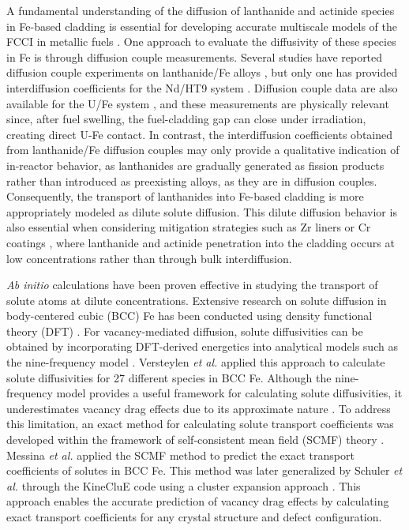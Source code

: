 \documentclass[preprint,12pt]{elsarticle}
\begin{document}
A fundamental understanding of the diffusion of lanthanide and actinide species in Fe-based cladding is essential for developing accurate multiscale models of the FCCI in metallic fuels \cite{aagesen_jr_physics-based_2022, aagesen_mechanistic_2023}. One approach to evaluate the diffusivity of these species in Fe is through diffusion couple measurements. Several studies have reported diffusion couple experiments on lanthanide/Fe alloys \cite{INAGAKI2013574, JERRED2020152387, helmreich_diffusion_2014}, but only one has provided interdiffusion coefficients for the Nd/HT9 system \cite{helmreich_diffusion_2014}. Diffusion couple data are also available for the U/Fe system \cite{huang2012interdiffusion, chen2015intermetallic}, and these measurements are physically relevant since, after fuel swelling, the fuel-cladding gap can close under irradiation, creating direct U-Fe contact. In contrast, the interdiffusion coefficients obtained from lanthanide/Fe diffusion couples may only provide a qualitative indication of in-reactor behavior, as lanthanides are gradually generated as fission products rather than introduced as preexisting alloys, as they are in diffusion couples. Consequently, the transport of lanthanides into Fe-based cladding is more appropriately modeled as dilute solute diffusion. This dilute diffusion behavior is also essential when considering mitigation strategies such as Zr liners or Cr coatings \cite{ryu_performance_2009, kim_performance_2009, jee_improvement_2013, OH2024113102}, where lanthanide and actinide penetration into the cladding occurs at low concentrations rather than through bulk interdiffusion.


\textit{Ab initio} calculations have been proven effective in studying the transport of solute atoms at dilute concentrations. Extensive research on solute diffusion in body-centered cubic (BCC) Fe has been conducted using density functional theory (DFT) \cite{messina_exact_2014, murali_bcc_fe_2015, versteylen_first-principles_2017}. For vacancy-mediated diffusion, solute diffusivities can be obtained by incorporating DFT-derived energetics into analytical models such as the nine-frequency model \cite{leclaire1970}. Versteylen \textit{et al.} \cite{versteylen_first-principles_2017} applied this approach to calculate solute diffusivities for 27 different species in BCC Fe. Although the nine-frequency model provides a useful framework for calculating solute diffusivities, it underestimates vacancy drag effects due to its approximate nature \cite{messina_exact_2014}. To address this limitation, an exact method for calculating solute transport coefficients was developed within the framework of self-consistent mean field (SCMF) theory \cite{nastar_self-consistent_2000, nastar_mean_2005}. Messina \textit{et al.} \cite{messina_exact_2014} applied the SCMF method to predict the exact transport coefficients of solutes in BCC Fe. This method was later generalized by Schuler  \textit{et al.} through the KineCluE code \cite{schuler_kineclue_2020} using a cluster expansion approach \cite{schuler_transport_2016}. This approach enables the accurate prediction of vacancy drag effects by calculating exact transport coefficients for any crystal structure and defect configuration.
\end{document}
